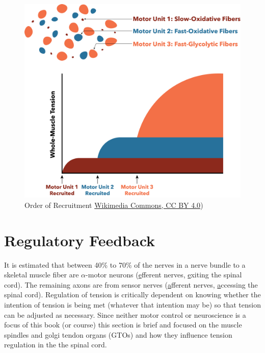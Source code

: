 \begin{figure}[!ht]
    \centering
    \includegraphics[width=1\linewidth]{./figure/Motor_unit_recruitment.png}
    \caption{Order of Recruitment \footnotesize{\href{https://commons.wikimedia.org/wiki/File:Motor_unit_recruitment.png}{Wikimedia Commons, CC BY 4.0})}}
    \label{fig:Motor_unit_recruitment}
\end{figure}


\section{Regulatory Feedback}

It is estimated that between 40\% to 70\% of the nerves in a nerve bundle to a skeletal muscle fiber are $\alpha$-motor neurons (\underline{e}fferent nerves, \underline{e}xiting the spinal cord). The remaining axons are from sensor nerves (\underline{a}fferent nerves, \underline{a}ccessing the spinal cord). Regulation of tension is critically dependent on knowing whether the intention of tension is being met (whatever that intention may be) so that tension can be adjusted as necessary. Since neither motor control or neuroscience is a focus of this book (or course) this section is brief and focused on the muscle spindles and golgi tendon organs (GTOs) and how they influence tension regulation in the the spinal cord. 

